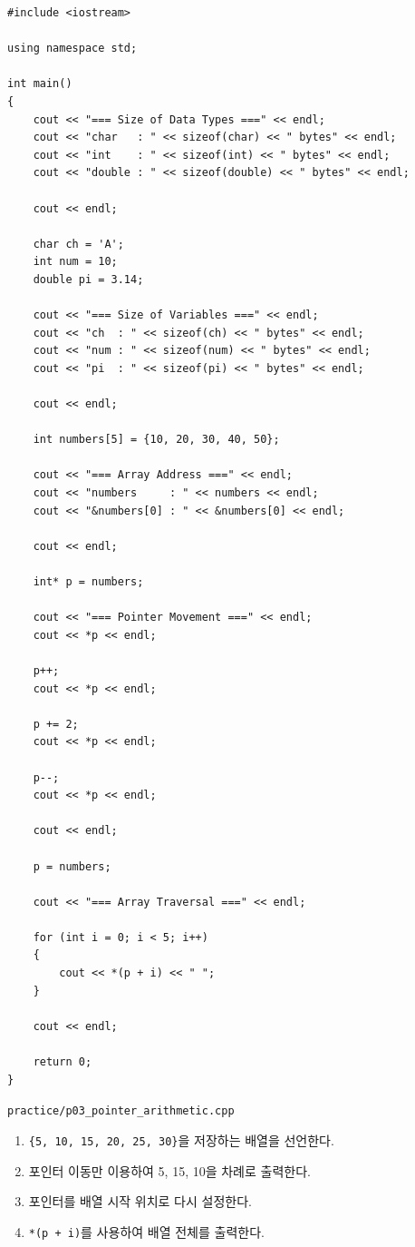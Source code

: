 \documentclass[11pt,a4paper]{article}
\begin{document}
\begin{lstlisting}
#include <iostream>

using namespace std;

int main()
{
    cout << "=== Size of Data Types ===" << endl;
    cout << "char   : " << sizeof(char) << " bytes" << endl;
    cout << "int    : " << sizeof(int) << " bytes" << endl;
    cout << "double : " << sizeof(double) << " bytes" << endl;

    cout << endl;

    char ch = 'A';
    int num = 10;
    double pi = 3.14;

    cout << "=== Size of Variables ===" << endl;
    cout << "ch  : " << sizeof(ch) << " bytes" << endl;
    cout << "num : " << sizeof(num) << " bytes" << endl;
    cout << "pi  : " << sizeof(pi) << " bytes" << endl;

    cout << endl;

    int numbers[5] = {10, 20, 30, 40, 50};

    cout << "=== Array Address ===" << endl;
    cout << "numbers     : " << numbers << endl;
    cout << "&numbers[0] : " << &numbers[0] << endl;

    cout << endl;

    int* p = numbers;

    cout << "=== Pointer Movement ===" << endl;
    cout << *p << endl;

    p++;
    cout << *p << endl;

    p += 2;
    cout << *p << endl;

    p--;
    cout << *p << endl;

    cout << endl;

    p = numbers;

    cout << "=== Array Traversal ===" << endl;

    for (int i = 0; i < 5; i++)
    {
        cout << *(p + i) << " ";
    }

    cout << endl;

    return 0;
}
\end{lstlisting}

\begin{practicebox}
\texttt{practice/p03\_pointer\_arithmetic.cpp}
\begin{enumerate}[leftmargin=1.5em]
    \item \texttt{\{5, 10, 15, 20, 25, 30\}}을 저장하는 배열을 선언한다.
    \item 포인터 이동만 이용하여 5, 15, 10을 차례로 출력한다.
    \item 포인터를 배열 시작 위치로 다시 설정한다.
    \item \texttt{*(p + i)}를 사용하여 배열 전체를 출력한다.
\end{enumerate}
\end{practicebox}
\end{document}
